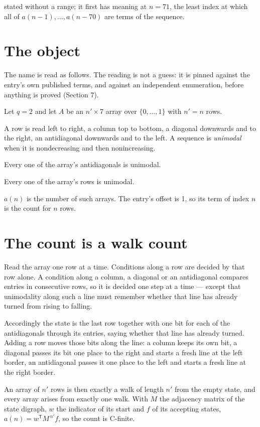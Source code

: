 \documentclass[11pt]{article}
\theoremstyle{definition}
\begin{document}
stated without a range; it first has meaning at $n = 71$, the least index at which all of $a(n-1),\dots,a(n-70)$ are terms of the sequence.

\section{The object}

The name is read as follows. The reading is not a guess: it is pinned against the entry's own published terms, and against an independent enumeration, before anything is proved (Section 7).

Let $q = 2$ and let $A$ be an $n' \times 7$ array over $\{0,\dots,1\}$ with $n' = n$ rows.

A row is read left to right, a column top to bottom, a diagonal downwards and to the right, an antidiagonal downwards and to the left. A sequence is {\itshape unimodal} when it is nondecreasing and then nonincreasing.

Every one of the array's antidiagonals is unimodal.

Every one of the array's rows is unimodal.

$a(n)$ is the number of such arrays. The entry's offset is 1, so its term of index $n$ is the count for $n$ rows.

\section{The count is a walk count}

Read the array one row at a time. Conditions along a row are decided by that row alone. A condition along a column, a diagonal or an antidiagonal compares entries in consecutive rows, so it is decided one step at a time --- except that unimodality along such a line must remember whether that line has already turned from rising to falling.

Accordingly the state is the last row together with one bit for each of the antidiagonals through its entries, saying whether that line has already turned. Adding a row moves those bits along the line: a column keeps its own bit, a diagonal passes its bit one place to the right and starts a fresh line at the left border, an antidiagonal passes it one place to the left and starts a fresh line at the right border.

An array of $n'$ rows is then exactly a walk of length $n'$ from the empty state, and every array arises from exactly one walk. With $M$ the adjacency matrix of the state digraph, $w$ the indicator of its start and $f$ of its accepting states, $a(n) = w^{\mathsf T}M^{\,n'}f$, so the count is C-finite.
\end{document}
